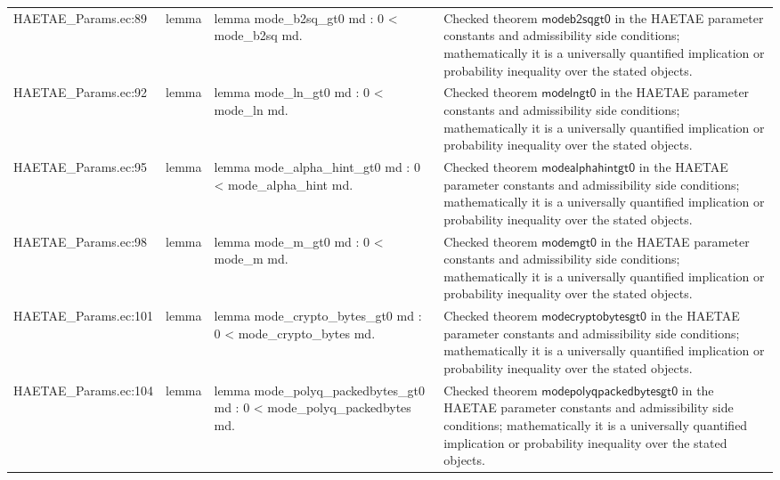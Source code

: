 \documentclass[10pt]{article}
\begin{document}
\begin{longtable}{L{0.11\textwidth}L{0.055\textwidth}L{0.385\textwidth}L{0.41\textwidth}}
HAETAE\_\allowbreak{}Params.\allowbreak{}ec:\allowbreak{}89 & lemma & {\ttfamily\scriptsize lemma mode\_\allowbreak{}b2sq\_\allowbreak{}gt0 md : 0 \textless{} mode\_\allowbreak{}b2sq md.} & Checked theorem $\mathsf{modeb2sqgt0}$ in the HAETAE parameter constants and admissibility side conditions; mathematically it is a universally quantified implication or probability inequality over the stated objects. \\
HAETAE\_\allowbreak{}Params.\allowbreak{}ec:\allowbreak{}92 & lemma & {\ttfamily\scriptsize lemma mode\_\allowbreak{}ln\_\allowbreak{}gt0 md : 0 \textless{} mode\_\allowbreak{}ln md.} & Checked theorem $\mathsf{modelngt0}$ in the HAETAE parameter constants and admissibility side conditions; mathematically it is a universally quantified implication or probability inequality over the stated objects. \\
HAETAE\_\allowbreak{}Params.\allowbreak{}ec:\allowbreak{}95 & lemma & {\ttfamily\scriptsize lemma mode\_\allowbreak{}alpha\_\allowbreak{}hint\_\allowbreak{}gt0 md : 0 \textless{} mode\_\allowbreak{}alpha\_\allowbreak{}hint md.} & Checked theorem $\mathsf{modealphahintgt0}$ in the HAETAE parameter constants and admissibility side conditions; mathematically it is a universally quantified implication or probability inequality over the stated objects. \\
HAETAE\_\allowbreak{}Params.\allowbreak{}ec:\allowbreak{}98 & lemma & {\ttfamily\scriptsize lemma mode\_\allowbreak{}m\_\allowbreak{}gt0 md : 0 \textless{} mode\_\allowbreak{}m md.} & Checked theorem $\mathsf{modemgt0}$ in the HAETAE parameter constants and admissibility side conditions; mathematically it is a universally quantified implication or probability inequality over the stated objects. \\
HAETAE\_\allowbreak{}Params.\allowbreak{}ec:\allowbreak{}101 & lemma & {\ttfamily\scriptsize lemma mode\_\allowbreak{}crypto\_\allowbreak{}bytes\_\allowbreak{}gt0 md : 0 \textless{} mode\_\allowbreak{}crypto\_\allowbreak{}bytes md.} & Checked theorem $\mathsf{modecryptobytesgt0}$ in the HAETAE parameter constants and admissibility side conditions; mathematically it is a universally quantified implication or probability inequality over the stated objects. \\
HAETAE\_\allowbreak{}Params.\allowbreak{}ec:\allowbreak{}104 & lemma & {\ttfamily\scriptsize lemma mode\_\allowbreak{}polyq\_\allowbreak{}packedbytes\_\allowbreak{}gt0 md : 0 \textless{} mode\_\allowbreak{}polyq\_\allowbreak{}packedbytes md.} & Checked theorem $\mathsf{modepolyqpackedbytesgt0}$ in the HAETAE parameter constants and admissibility side conditions; mathematically it is a universally quantified implication or probability inequality over the stated objects. \\

\end{longtable}
\end{document}
